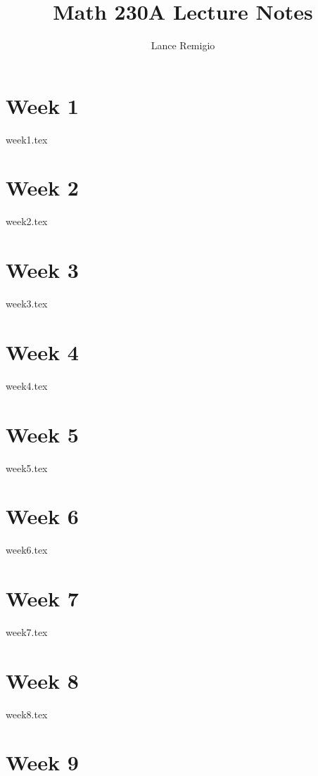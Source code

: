 \documentclass{report}
\title{Math 230A Lecture Notes}
\author{Lance Remigio}
\begin{document}
\maketitle 
\tableofcontents


\chapter{Week 1}

{week1.tex}

\chapter{Week 2}

{week2.tex}

\chapter{Week 3}

{week3.tex}

\chapter{Week 4}

{week4.tex}

\chapter{Week 5}

{week5.tex}

\chapter{Week 6}

{week6.tex}

\chapter{Week 7}

{week7.tex}

\chapter{Week 8}

{week8.tex}

\chapter{Week 9}
\end{document}
